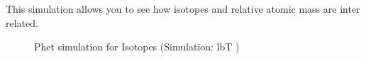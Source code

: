 This simulation allows you to see how isotopes and relative atomic mass are inter related.
    \setcounter{subfigure}{0}
	\begin{figure}[H] %
    \textnormal{Phet simulation for Isotopes}\vspace{.1in} \nopagebreak
  \label{m38806*phet!!!underscore!!!sim}\label{m38806*phet-simulation}
             { (Simulation:  lbT )}
      \vspace{2pt}
    \vspace{.1in}
 \end{figure}           \par
\label{m38753*secfhsst!!!underscore!!!id400}\vspace{.5cm} 



